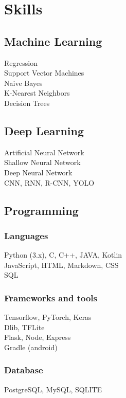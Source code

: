 \section{Skills}

\subsection{Machine Learning}
Regression \\
Support Vector Machines \\
Naive Bayes \\
K-Nearest Neighbors \\
Decision Trees \\

\sectionspace %

\subsection{Deep Learning}
Artificial Neural Network \\
Shallow Neural Network \\
Deep Neural Network \\
CNN, RNN, R-CNN, YOLO \\

\sectionspace

\subsection{Programming}

\subsubsection*{Languages}
Python (3.x), C, C++, JAVA, Kotlin \\
JavaScript, HTML, Markdown, CSS \\
SQL \\

\subsubsection*{Frameworks and tools}
Tensorflow, PyTorch, Keras\\
Dlib, TFLite \\
Flask, Node, Express \\
Gradle (android) \\

\subsubsection*{Database}
PostgreSQL, MySQL, SQLITE \\

